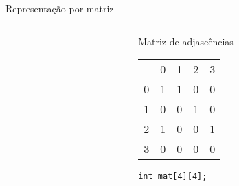 \begin{frame}{Representação por matriz}{\inserttitle}

\begin{columns}

\begin{column}{.5\textwidth}

\GD

\end{column}

\begin{column}{.5\textwidth}

\noindent Matriz de adjascências\bigskip

\def\R{\color{red}}
\def\Z{{\color{gray}0}}
\begin{tabular}{ccccc}
		     &\R 0   &\R 1   &\R 2  &\R 3\\
\color{red}	   0 & 	 1   &   1   &  \Z  &  \Z \\
\color{red} 	   1 &	\Z   &  \Z   &   1  &  \Z \\
\color{red} 	   2 & 	 1   &  \Z   &  \Z  &   1 \\
\color{red} 	   3 &  \Z   &  \Z   &  \Z  &  \Z \\
\end{tabular}

 {
\vskip 1cm {\tt int mat[4][4];}
}
\end{column}
\end{columns}

\end{frame}


\def\NULL#1{
  \node[on chain,draw,inner sep=6pt] (N#1)[right of=#1,xshift=-.75cm]{};
  \draw (N#1.north east) -- (N#1.south west);
  \draw (N#1.north west) -- (N#1.south east);
  \draw[*->] let \p1 = (#1.two), \p2 = (#1.center) in (\x1,\y2) -- (N#1);
}

\def\EMPTYKEY#1{
  \node[on chain,draw,inner sep=6pt] (E#1)[right of=#1]{};
  \draw (E#1.north east) -- (E#1.south west);
  \draw (E#1.north west) -- (E#1.south east);
  \draw[*->] (#1) -- (E#1);
}

